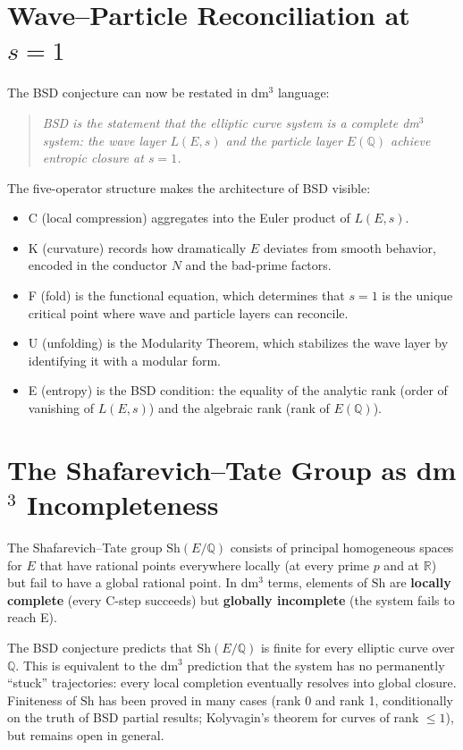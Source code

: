 \documentclass[14pt, twoside, openright]{book}
\newcommand{\Sha}{\mathrm{Sh}}
\theoremstyle{definition}
\theoremstyle{remark}
\newenvironment{structuralclaim}{%
  \begin{quote}\itshape}{\end{quote}}
\begin{document}
\section{Wave--Particle Reconciliation at $s = 1$}

The BSD conjecture can now be restated in dm$^{3}$ language:

\begin{structuralclaim}
BSD is the statement that the elliptic curve system is a complete dm$^{3}$
system: the wave layer $L(E,s)$ and the particle layer $E(\mathbb{Q})$ achieve
entropic closure at $s = 1$.
\end{structuralclaim}

The five-operator structure makes the architecture of BSD visible:

\begin{itemize}[leftmargin=2em]
  \item C (local compression) aggregates into the Euler product of $L(E,s)$.
  \item K (curvature) records how dramatically $E$ deviates from smooth behavior,
        encoded in the conductor $N$ and the bad-prime factors.
  \item F (fold) is the functional equation, which determines that $s = 1$ is
        the unique critical point where wave and particle layers can reconcile.
  \item U (unfolding) is the Modularity Theorem, which stabilizes the wave layer
        by identifying it with a modular form.
  \item E (entropy) is the BSD condition: the equality of the analytic rank
        (order of vanishing of $L(E,s)$) and the algebraic rank (rank of
        $E(\mathbb{Q})$).
\end{itemize}

\section{The Shafarevich--Tate Group as dm$^{3}$ Incompleteness}

The Shafarevich--Tate group $\Sha(E/\mathbb{Q})$ consists of principal homogeneous
spaces for $E$ that have rational points everywhere locally (at every prime $p$
and at $\mathbb{R}$) but fail to have a global rational point. In dm$^{3}$ terms,
elements of $\Sha$ are \textbf{locally complete} (every C-step succeeds) but
\textbf{globally incomplete} (the system fails to reach E).

The BSD conjecture predicts that $\Sha(E/\mathbb{Q})$ is finite for every
elliptic curve over $\mathbb{Q}$. This is equivalent to the dm$^{3}$ prediction
that the system has no permanently ``stuck'' trajectories: every local completion
eventually resolves into global closure. Finiteness of $\Sha$ has been proved in
many cases (rank 0 and rank 1, conditionally on the truth of BSD partial results;
Kolyvagin's theorem for curves of rank $\leq 1$), but remains open in general.
\end{document}
